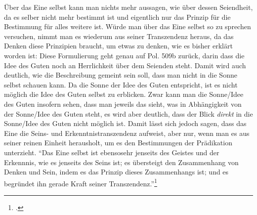 Über das Eine selbst kann man nichts mehr aussagen, wie über dessen Seiendheit, da es selber nicht mehr bestimmt ist und eigentlich nur das Prinzip für die Bestimmung für alles weitere ist. Würde man über das Eine selbst so zu sprechen versuchen, nimmt man es wiederum aus seiner Transzendenz heraus, da das Denken diese Prinzipien braucht, um etwas zu denken, wie es bisher erklärt worden ist:
Diese Formulierung geht genau auf Pol. 509b zurück, darin dass die Idee des Guten noch an Herrlichkeit über dem Seienden steht. Damit wird auch deutlich, wie die Beschreibung gemeint sein soll, dass man nicht in die Sonne selbst schauen kann. Da die Sonne der Idee des Guten entspricht, ist es nicht möglich die Idee des Guten selbst zu erblicken. Zwar kann man die Sonne/Idee des Guten insofern sehen, dass man jeweils das sieht, was in Abhängigkeit von der Sonne/Idee des Guten steht, es wird aber deutlich, dass der Blick \emph{direkt} in die Sonne/Idee des Guten nicht möglich ist.
Damit lässt sich jedoch sagen, dass das Eine die Seins- und Erkenntnistranszendenz aufweist, aber nur, wenn man es aus seiner reinen Einheit herausholt, um es den Bestimmungen der Prädikation unterzieht. \enquote{Das Eine selbst ist ebensosehr jenseits des Geistes und der Erkennnis, wie es jenseits des Seins ist; es übersteigt den Zusammenhang von Denken und Sein, indem es das Prinzip dieses Zusammenhangs ist; und es begründet ihn gerade Kraft seiner Transzendenz.}\footcite[][S. 102]{halfwassen2015spuren}
